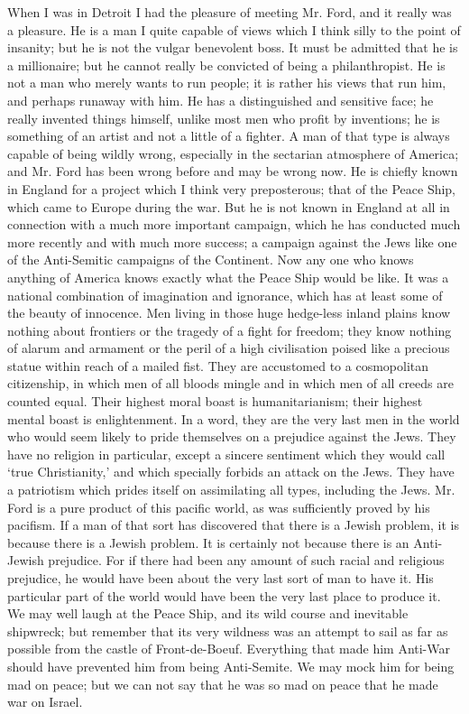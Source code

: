 \documentclass{book}
\begin{document}
When I was in Detroit I had the pleasure of meeting Mr. Ford, and it really was a pleasure. He is a man I quite capable of views which I think silly to the point of insanity; but he is not the vulgar benevolent boss. It must be admitted that he is a millionaire; but he cannot really be convicted of being a philanthropist. He is not a man who merely wants to run people; it is rather his views that run him, and perhaps runaway with him. He has a distinguished and sensitive face; he really invented things himself, unlike most men who profit by inventions; he is something of an artist and not a little of a fighter. A man of that type is always capable of being wildly wrong, especially in the sectarian atmosphere of America; and Mr. Ford has been wrong before and may be wrong now. He is chiefly known in England for a project which I think very preposterous; that of the Peace Ship, which came to Europe during the war. But he is not known in England at all in connection with a much more important campaign, which he has conducted much more recently and with much more success; a campaign against the Jews like one of the Anti-Semitic campaigns of the Continent. Now any one who knows anything of America knows exactly what the Peace Ship would be like. It was a national combination of imagination and ignorance, which has at least some of the beauty of innocence. Men living in those huge hedge-less inland plains know nothing about frontiers or the tragedy of a fight for freedom; they know nothing of alarum and armament or the peril of a high civilisation poised like a precious statue within reach of a mailed fist. They are accustomed to a cosmopolitan citizenship, in which men of all bloods mingle and in which men of all creeds are counted equal. Their highest moral boast is humanitarianism; their highest mental boast is enlightenment. In a word, they are the very last men in the world who would seem likely to pride themselves on a prejudice against the Jews. They have no religion in particular, except a sincere sentiment which they would call ‘true Christianity,’ and which specially forbids an attack on the Jews. They have a patriotism which prides itself on assimilating all types, including the Jews. Mr. Ford is a pure product of this pacific world, as was sufficiently proved by his pacifism. If a man of that sort has discovered that there is a Jewish problem, it is because there is a Jewish problem. It is certainly not because there is an Anti-Jewish prejudice. For if there had been any amount of such racial and religious prejudice, he would have been about the very last sort of man to have it. His particular part of the world would have been the very last place to produce it. We may well laugh at the Peace Ship, and its wild course and inevitable shipwreck; but remember that its very wildness was an attempt to sail as far as possible from the castle of Front-de-Boeuf. Everything that made him Anti-War should have prevented him from being Anti-Semite. We may mock him for being mad on peace; but we can not say that he was so mad on peace that he made war on Israel.
\end{document}
